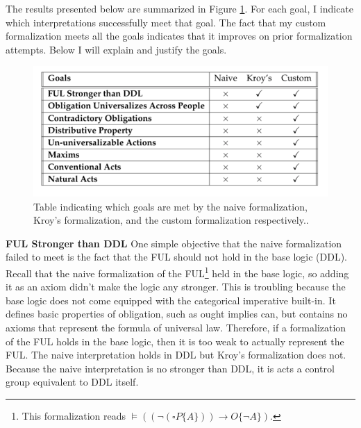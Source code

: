 \begin{isabellebody}
\begin{isamarkuptext}
The results presented below are summarized in Figure \ref{fig:goalstable}. For each goal, I indicate which 
interpretations successfully meet that goal. The fact that my custom formalization meets all the goals
indicates that it improves on prior formalization attempts. Below I will explain and justify
the goals.%
\end{isamarkuptext}\isamarkuptrue%
%
\begin{figure}
\centering
\includegraphics[scale=0.4]{goalstable.png}
\caption{Table indicating which goals are met by the naive formalization, Kroy's formalization, and 
the custom formalization respectively..} \label{fig:goalstable}
\end{figure}
%
\isadelimdocument
%
\endisadelimdocument
%
\isatagdocument
%
\isamarkuptrue%
%
\endisatagdocument
{\isafolddocument}%
%
\isadelimdocument
%
\endisadelimdocument
%
\begin{isamarkuptext}%
\textbf{FUL Stronger than DDL} One simple objective that the naive formalization failed to meet is the fact that the FUL should
not hold in the base logic (DDL). Recall that the naive formalization of the FUL\footnote{
This formalization reads $\vDash ((\neg (\square P \{A\})) \longrightarrow O \{\neg A\})$.} held in the 
base logic, so adding it as an axiom didn't make the logic any stronger. This is troubling 
because the base logic does not come equipped with the categorical imperative built-in. It 
defines basic properties of obligation, such as ought implies can, but contains no axioms that represent
the formula of universal law. Therefore, if a formalization of the FUL holds in the 
base logic, then it is too weak to actually represent the FUL. The naive interpretation holds in DDL but Kroy's formalization
does not. Because the naive interpretation is no stronger than DDL, it is acts a control group equivalent
to DDL itself.

\medskip 


\end{isamarkuptext}
\end{isabellebody}
